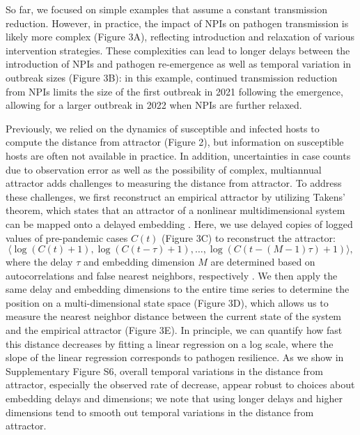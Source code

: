 \documentclass[12pt]{article}
\begin{document}
So far, we focused on simple examples that assume a constant transmission reduction.
However, in practice, the impact of NPIs on pathogen transmission is likely more complex (Figure 3A), reflecting introduction and relaxation of various intervention strategies.
These complexities can lead to longer delays between the introduction of NPIs and pathogen re-emergence as well as temporal variation in outbreak sizes (Figure 3B):
in this example, continued transmission reduction from NPIs limits the size of the first outbreak in 2021 following the emergence, allowing for a larger outbreak in 2022 when NPIs are further relaxed.

Previously, we relied on the dynamics of susceptible and infected hosts to compute the distance from attractor (Figure 2), but information on susceptible hosts are often not available in practice.
In addition, uncertainties in case counts due to observation error as well as the possibility of complex, multiannual attractor adds challenges to measuring the distance from attractor.
To address these challenges, we first reconstruct an empirical attractor by utilizing Takens' theorem, which states that an attractor of a nonlinear multidimensional system can be mapped onto a delayed embedding \citep{takens2006detecting}.
Here, we use delayed copies of logged values of pre-pandemic cases $C(t)$ (Figure 3C) to reconstruct the attractor:
\begin{equation}
\langle\log(C(t)+1), \log(C(t-\tau)+1), \dots, \log(C(t-(M-1)\tau)+1)\rangle,
\end{equation}
where the delay $\tau$ and embedding dimension $M$ are determined based on autocorrelations and false nearest neighbors, respectively \citep{kennel1992determining,tan2023selecting}.
We then apply the same delay and embedding dimensions to the entire time series to determine the position on a multi-dimensional state space (Figure 3D), which allows us to measure the nearest neighbor distance between the current state of the system and the empirical attractor (Figure 3E).
In principle, we can quantify how fast this distance decreases by fitting a linear regression on a log scale, where the slope of the linear regression corresponds to pathogen resilience.
As we show in Supplementary Figure S6, overall temporal variations in the distance from attractor, especially the observed rate of decrease, appear robust to choices about embedding delays and dimensions; 
we note that using longer delays and higher dimensions tend to smooth out temporal variations in the distance from attractor.
\end{document}
